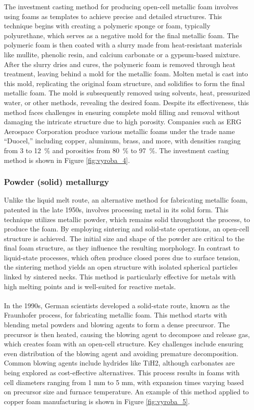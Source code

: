 \documentclass[a4paper]{article}
\begin{document}
\noindent The investment casting method for producing open-cell metallic foam involves using foams as templates to achieve precise and detailed structures. This technique begins with creating a polymeric sponge or foam, typically polyurethane, which serves as a negative mold for the final metallic foam. 
The polymeric foam is then coated with a slurry made from heat-resistant materials like mullite, phenolic resin, and calcium carbonate or a gypsum-based mixture. After the slurry dries and cures, the polymeric foam is removed through heat treatment, leaving behind a mold for the metallic foam. Molten metal is cast into this mold, replicating the original foam structure, and solidifies to form the final metallic foam. 
The mold is subsequently removed using solvents, heat, pressurized water, or other methods, revealing the desired foam. Despite its effectiveness, this method faces challenges in ensuring complete mold filling and removal without damaging the intricate structure due to high porosity. 
Companies such as ERG Aerospace Corporation produce various metallic foams under the trade name “Duocel,” including copper, aluminum, brass, and more, with densities ranging from 3 to 12~\% and porosities from 80~\% to 97~\%. 
The investment casting method is shown in Figure \ref{fig:vyroba_4}.

\subsubsection{Powder (solid) metallurgy}
Unlike the liquid melt route, an alternative method for fabricating metallic foam, patented in the late 1950s, involves processing metal in its solid form. This technique utilizes metallic powder, which remains solid throughout the process, to produce the foam. By employing sintering and solid-state operations, an open-cell structure is achieved. The initial size and shape of the powder are critical to the final foam structure, as they influence the resulting morphology. In contrast to liquid-state processes, which often produce closed pores due to surface tension, the sintering method yields an open structure with isolated spherical particles linked by sintered necks. This method is particularly effective for metals with high melting points and is well-suited for reactive metals.
\\
\\
\noindent In the 1990s, German scientists developed a solid-state route, known as the Fraunhofer process, for fabricating metallic foam. This method starts with blending metal powders and blowing agents to form a dense precursor. The precursor is then heated, causing the blowing agent to decompose and release gas, which creates foam with an open-cell structure. Key challenges include ensuring even distribution of the blowing agent and avoiding premature decomposition. Common blowing agents include hydrides like TiH2, although carbonates are being explored as cost-effective alternatives. This process results in foams with cell diameters ranging from 1 mm to 5 mm, with expansion times varying based on precursor size and furnace temperature.
An example of this method applied to copper foam manufacturing is shown in Figure \ref{fig:vyroba_5}.
\end{document}
